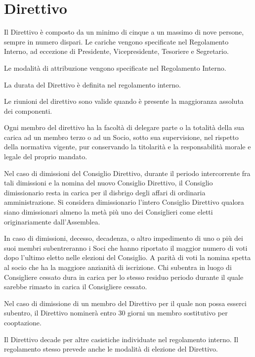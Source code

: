 \documentclass[legalpaper, 11pt]{exam}
\let\tempone\enumerate
\let\temptwo\endenumerate
\renewenvironment{enumerate}{\tempone\addtolength{\itemsep}{-0.45\baselineskip}}{\temptwo}
\begin{document}
{\section{Direttivo}
\begin{enumerate}
	\item Il Direttivo è composto da un minimo di cinque a un massimo di nove persone, sempre in numero dispari. Le cariche vengono specificate nel Regolamento Interno, ad eccezione di Presidente, Vicepresidente, Tesoriere e Segretario.
	\item Le modalità di attribuzione vengono specificate nel Regolamento Interno.
	\item La durata del Direttivo è definita nel regolamento interno.
	\item Le riunioni del direttivo sono valide quando è presente la maggioranza assoluta dei componenti.
	\item Ogni membro del direttivo ha la facoltà di delegare parte o la totalità della sua carica ad un membro terzo o ad un Socio, sotto sua supervisione, nel rispetto della normativa vigente, pur conservando la titolarità e la responsabilità morale e legale del proprio mandato.
	\item Nel caso di dimissioni del Consiglio Direttivo, durante il periodo intercorrente fra tali dimissioni e la nomina del nuovo Consiglio Direttivo, il Consiglio dimissionario resta in carica per il disbrigo degli affari di ordinaria amministrazione. Si considera dimissionario l’intero Consiglio Direttivo qualora siano dimissionari almeno la metà più uno dei Consiglieri come eletti originariamente dall’Assemblea.
	\item In caso di dimissioni, decesso, decadenza, o altro impedimento di uno o più dei suoi membri subentreranno i Soci che hanno riportato il maggior numero di voti dopo l’ultimo eletto nelle elezioni del Consiglio. A parità di voti la nomina spetta al socio che ha la maggiore anzianità di iscrizione. Chi subentra in luogo di Consigliere cessato dura in carica per lo stesso residuo periodo durante il quale sarebbe rimasto in carica il Consigliere cessato.
	\item Nel caso di dimissione di un membro del Direttivo per il quale non possa esserci subentro, il Direttivo nominerà entro 30 giorni un membro sostitutivo per cooptazione.
	\item Il Direttivo decade per altre casistiche individuate nel regolamento interno. Il regolamento stesso  prevede anche le modalità di elezione del Direttivo.
\end{enumerate}

}
\end{document}

